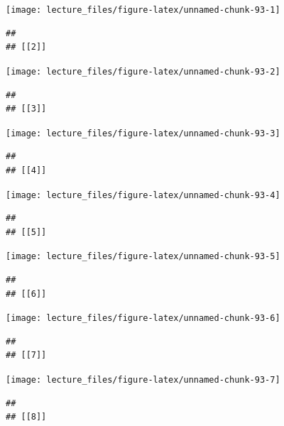 \documentclass[
]{book}
\begin{document}
\begin{center}\texttt{[image: lecture\_files/figure-latex/unnamed-chunk-93-1]} \end{center}

\begin{verbatim}
## 
## [[2]]
\end{verbatim}

\begin{center}\texttt{[image: lecture\_files/figure-latex/unnamed-chunk-93-2]} \end{center}

\begin{verbatim}
## 
## [[3]]
\end{verbatim}

\begin{center}\texttt{[image: lecture\_files/figure-latex/unnamed-chunk-93-3]} \end{center}

\begin{verbatim}
## 
## [[4]]
\end{verbatim}

\begin{center}\texttt{[image: lecture\_files/figure-latex/unnamed-chunk-93-4]} \end{center}

\begin{verbatim}
## 
## [[5]]
\end{verbatim}

\begin{center}\texttt{[image: lecture\_files/figure-latex/unnamed-chunk-93-5]} \end{center}

\begin{verbatim}
## 
## [[6]]
\end{verbatim}

\begin{center}\texttt{[image: lecture\_files/figure-latex/unnamed-chunk-93-6]} \end{center}

\begin{verbatim}
## 
## [[7]]
\end{verbatim}

\begin{center}\texttt{[image: lecture\_files/figure-latex/unnamed-chunk-93-7]} \end{center}

\begin{verbatim}
## 
## [[8]]
\end{verbatim}
\end{document}

